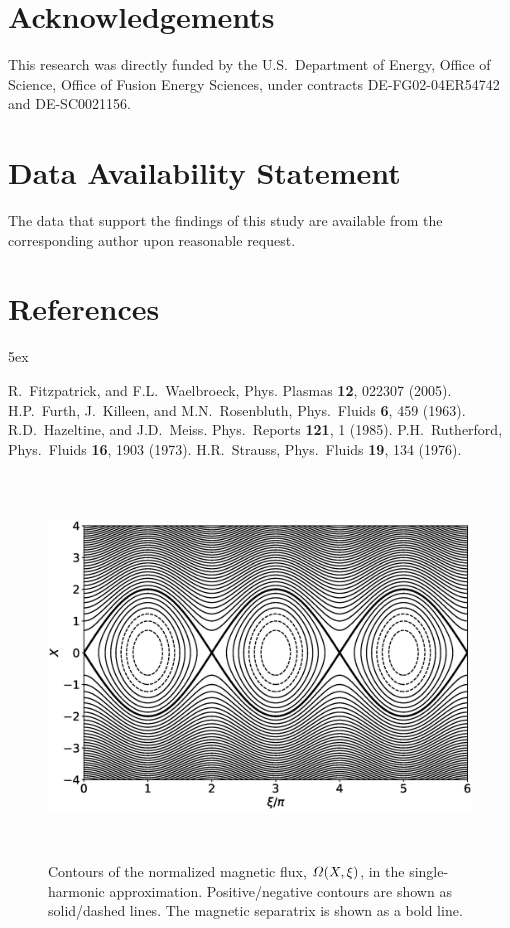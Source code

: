 \documentclass[12pt,prb,aps]{revtex4-1}
\begin{document}
 
\section*{Acknowledgements}
This research was directly funded by the U.S.\ Department of Energy, Office of Science, Office of Fusion Energy Sciences,  under  contracts DE-FG02-04ER54742 and DE-SC0021156. 

\section*{Data Availability Statement}
The data that support the findings of this study are available from the corresponding author upon reasonable request.

\section*{References}
\begin{thebibliography}{99}\baselineskip 5ex

 R.~Fitzpatrick, and F.L.~Waelbroeck, Phys. Plasmas {\bf 12}, 022307 (2005).
 H.P.~Furth, J.~Killeen, and M.N.~Rosenbluth, Phys.\ Fluids {\bf 6}, 459 (1963).
 R.D.~Hazeltine, and J.D.~Meiss. Phys.\ Reports {\bf 121}, 1 (1985).
 P.H.~Rutherford,  Phys.\ Fluids {\bf 16}, 1903 (1973).
 H.R.~Strauss, Phys.\  Fluids {\bf 19}, 134 (1976). 
\end{thebibliography}

\begin{figure}
\centerline{\includegraphics[height=4in]{Figure1.eps}}
\caption{Contours of the normalized magnetic flux, ${\mit\Omega}(X,\xi)$, in the single-harmonic approximation. Positive/negative contours are shown as solid/dashed lines. The magnetic separatrix is shown
as a  bold line.}\label{fig1}
\end{figure}
\end{document}
